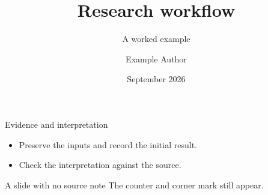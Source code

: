 \documentclass[aspectratio=169,11pt]{beamer}
\title{Research workflow}
\subtitle{A worked example}
\author{Example Author}
\institute{University of Notre Dame}
\date{September 2026}
\begin{document}
{
\begin{frame}[plain]
  \titlepage
\end{frame}
}

\begin{frame}{Evidence and interpretation}
  \begin{itemize}
    \item Preserve the inputs and record the initial result.
    \item Check the interpretation against the source.
  \end{itemize}
\end{frame}

\begin{frame}{A slide with no source note}
  The counter and corner mark still appear.
\end{frame}
\end{document}
